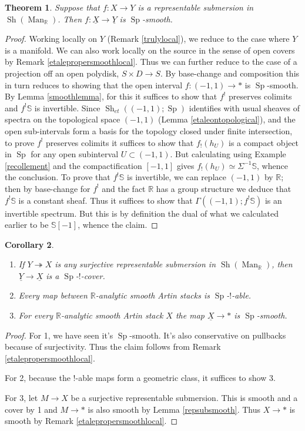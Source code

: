 \documentclass[12pt]{article}
\newtheorem{theorem}{Theorem}[section]
\newtheorem{corollary}[theorem]{Corollary}
\newcommand{\on}{\operatorname}
\newcommand{\mbb}{\mathbb}
\newcommand{\ul}{\underline}
\begin{document}
\begin{theorem}\label{realsmooth}
Suppose that $f:X\to Y$ is a representable submersion in $\on{Sh}(\on{Man}_\mathbb{R})$.  Then $f:\ul{X}\to\ul{Y}$ is $\on{Sp}$-smooth.
\end{theorem}
\begin{proof}
Working locally on $Y$ (Remark \ref{trulylocal}), we reduce to the case where $Y$ is a manifold.  We can also work locally on the source in the sense of open covers by Remark \ref{etalepropersmoothlocal}.  Thus we can further reduce to the case of a projection off an open polydisk, $S\times D \to S$.  By base-change and composition this in turn reduces to showing that the open interval $f:(-1,1)\to \ast$ is $\on{Sp}$-smooth.  By Lemma \ref{smoothlemma}, for this it suffices to show that $f^!$ preserves colimits and $f^!\mathbb{S}$ is invertible.  Since $\on{Sh}_{et}((-1,1);\on{Sp})$ identifies with usual sheaves of spectra on the topological space $(-1,1)$ (Lemma \ref{etaleontopological}), and the open sub-intervals form a basis for the topology closed under finite intersection, to prove $f^!$ preserves colimits it suffices to show that $f_!(h_U)$ is a compact object in $\on{Sp}$ for any open subinterval $U\subset (-1,1)$.  But calculating using Example \ref{recollement} and the compactification $[-1,1]$ gives $f_!(h_{U})\simeq \Sigma^{-1}\mbb{S}$, whence the conclusion.  To prove that $f^!\mbb{S}$ is invertible, we can replace $(-1,1)$ by $\mbb{R}$; then by base-change for $f^!$ and the fact $\mbb{R}$ has a group structure we deduce that $f^!\mbb{S}$ is a constant sheaf.  Thus it suffices to show that $\Gamma((-1,1);f^!\mbb{S})$ is an invertible spectrum.  But this is by definition the dual of what we calculated earlier to be $\mbb{S}[-1]$, whence the claim.
\end{proof}

\begin{corollary}\label{realartinsmooth}
\begin{enumerate}
\item If $Y\twoheadrightarrow X$ is any surjective representable submersion in $\on{Sh}(\on{Man}_{\mbb{R}})$, then $\ul{Y}\to\ul{X}$ is a $\on{Sp}$-$!$-cover.
\item Every map between $\mbb{R}$-analytic smooth Artin stacks is $\on{Sp}$-$!$-able.
\item For every $\mathbb{R}$-analytic smooth Artin stack $X$ the map $\underline{X}\to\ast$ is $\on{Sp}$-smooth.
\end{enumerate}
\end{corollary}
\begin{proof}
For 1, we have seen it's $\on{Sp}$-smooth.  It's also conservative on pullbacks because of surjectivity.  Thus the claim follows from Remark \ref{etalepropersmoothlocal}.

For 2, because the $!$-able maps form a geometric class, it suffices to show 3.

For 3, let $M\to X$ be a surjective representable submersion.  This is smooth and a cover by 1 and $M\to \ast$ is also smooth by Lemma \ref{repsubsmooth}.  Thus $X\to \ast$ is smooth by Remark \ref{etalepropersmoothlocal}.
\end{proof}
\end{document}
